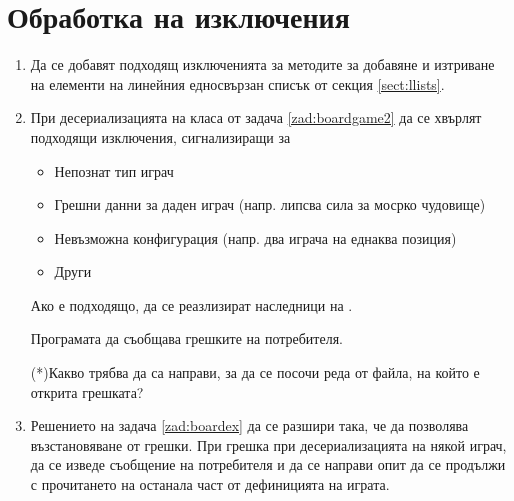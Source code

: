 \pagebreak

\section{Обработка на изключения}
\begin{enumerate}

  \item Да се добавят подходящ изключенията за методите за добавяне и изтриване на елементи на линейния едносвързан списък от секция \ref{sect:llists}.

  \item \label{zad:boardex}При десериализацията на класа  от задача \ref{zad:boardgame2} да се хвърлят подходящи изключения, сигнализиращи за 
  
  \begin{itemize}
    \item Непознат тип играч
    \item Грешни данни за даден играч (напр. липсва сила за мосрко чудовище)
    \item Невъзможна конфигурация (напр. два играча на еднаква позиция)
    \item Други
  \end{itemize}

  Ако е подходящо, да се реазлизират наследници на . 
  
  Програмата да съобщава грешките на потребителя.

  (*)Какво трябва да са направи, за да се посочи реда от файла, на който е открита грешката?

  \item Решението на задача \ref{zad:boardex} да се разшири така, че да позволява възстановяване от грешки. При грешка при десериализацията на някой играч, да се изведе съобщение на потребителя и да се направи опит да се продължи с прочитането на останала част от дефиницията на играта.
  

\end{enumerate}

